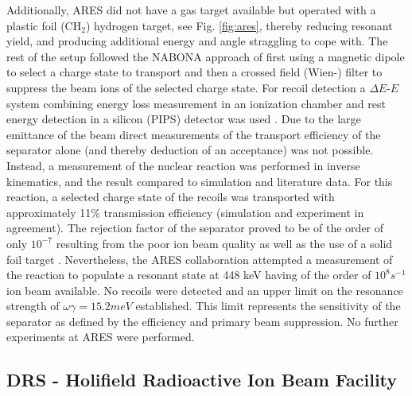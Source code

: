 Additionally, ARES did not have a gas target available but operated with a plastic foil (CH$_2$) hydrogen target, see Fig. \ref{fig:ares}, thereby reducing resonant yield, and producing additional energy and angle straggling to cope with. The rest of the setup followed the NABONA approach of first using a magnetic dipole to select a charge state to transport and then a crossed field (Wien-) filter to suppress the beam ions of the selected charge state. For recoil detection a $\Delta{}E$-$E$ system combining energy loss measurement in an ionization chamber and rest energy detection in a silicon (PIPS) detector was used \cite{coud03}. Due to the large emittance of the beam direct measurements of the transport efficiency of the separator alone (and thereby deduction of an acceptance) was not possible. Instead, a measurement of the nuclear reaction  was performed in inverse kinematics, and the result compared to simulation and literature data. For this reaction, a selected charge state of the  recoils was transported with approximately 11\% transmission efficiency (simulation and experiment in agreement). The rejection factor of the separator proved to be of the order of only $10^{-7}$ resulting from the poor ion beam quality as well as the use of a solid foil target \cite{angu01,coud05}. Nevertheless, the ARES collaboration attempted a measurement of the  reaction to populate a resonant state at 448 keV having of the order of $10^8 \unit{s^{-1}}$  ion beam available. No recoils were detected and an upper limit on the resonance strength of $\omega\gamma = 15.2 \unit{meV}$ established. This limit represents the sensitivity of the separator as defined by the efficiency and primary beam suppression. No further experiments at ARES were performed.

\subsection{DRS - Holifield Radioactive Ion Beam Facility}

